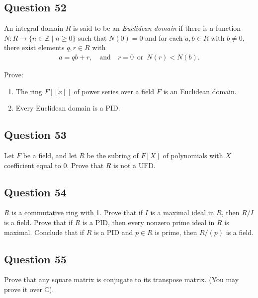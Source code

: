 \documentclass[12pt]{article}
\begin{document}
\hypertarget{question-52}{%
\subsection{Question 52}\label{question-52}}

An integral domain \(R\) is said to be an \emph{Euclidean domain} if
there is a function \(N: R \to \{n\in\mathbb{Z} \mid n\geq 0\}\) such
that \(N(0)=0\) and for each \(a,b\in R\) with \(b\neq 0\), there exist
elements \(q,r\in R\) with \begin{align*}
  a = qb + r, \quad \text{and} \quad r = 0 \, \text{ or } \, N(r) < N(b).
\end{align*}

Prove:

\begin{enumerate}
\def\labelenumi{\arabic{enumi}.}
\item
  The ring \(F[[x]]\) of power series over a field \(F\) is an Euclidean
  domain.
\item
  Every Euclidean domain is a PID.
\end{enumerate}

\hypertarget{question-53}{%
\subsection{Question 53}\label{question-53}}

Let \(F\) be a field, and let \(R\) be the subring of \(F[X]\) of
polynomials with \(X\) coefficient equal to \(0\). Prove that \(R\) is
not a UFD.

\hypertarget{question-54}{%
\subsection{Question 54}\label{question-54}}

\(R\) is a commutative ring with 1. Prove that if \(I\) is a maximal
ideal in \(R\), then \(R/I\) is a field. Prove that if \(R\) is a PID,
then every nonzero prime ideal in \(R\) is maximal. Conclude that if
\(R\) is a PID and \(p\in R\) is prime, then \(R/(p)\) is a field.

\hypertarget{question-55}{%
\subsection{Question 55}\label{question-55}}

Prove that any square matrix is conjugate to its transpose matrix. (You
may prove it over \(\mathbb{C}\)).
\end{document}

